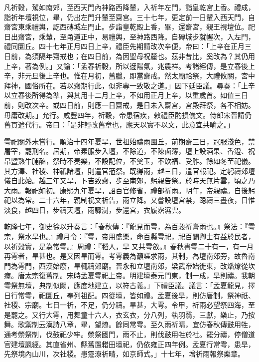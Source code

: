 \begin{pinyinscope}
凡祈穀，駕如南郊，至西天門內神路西降輦，入祈年左門，詣皇乾宮上香。禮成，詣祈年壇視位，畢，仍出左門升輦至齋宮。三十七年，更定前一日輦入西天門，自齋宮東乘禮輿，訖西磚城左門止。步詣皇乾殿上香，畢，還齋宮，親王視壇位。祀日出齋宮，乘輦，至甬道正中，易禮輿，至神路西降。自磚城步就幄次，入左門，禮同圜丘。四十七年正月四日上辛，禮臣先期請改次辛便，帝曰：「上辛在正月三日前，為須隔年齋戒也；在四日前，為因聖母祝釐也。茲非昔比，奚改為？其仍用上辛，著為例。」又諭：「孟春祈穀，所以迓陽氣，兆農祥。考諸經傳，是立春後上辛，非元旦後上辛也。惟在月初，舊臘，即當齋戒。然太廟祫祭，大禮攸關，宮中拜神，國俗所在。若以齋期行此，似非專一致敬之道。」因下廷臣議。尋奏：「上辛以立春後所得為準，與其用十二月上辛，不如用正月上辛，以重歲首。如值三日前，則改次辛。或四日前，則應一日齋戒，是日未入齋宮，宮殿拜祭，各不相妨。毋庸改期。」允行。咸豐四年，祈穀，帝患宿疾，敕禮臣酌損儀文。侍郎宋晉請仍舊貫遣代行。帝曰：「是非輕改舊章也，應天以實不以文，此意宜共喻之。」

雩祀關外未嘗行。順治十四年夏旱，世祖始禱雨圜丘，前期齋三日，冠服淺色，禁屠宰，罷刑名。屆期，帝素服步入壇，不除道，不陳鹵簿，壇上設酒果、香鐙、祝帛暨熟牛脯醢，祭時不奏樂，不設配位，不奠玉，不飲福、受胙。餘如冬至祀儀。其方澤、社稷、神祇諸壇，則遣官蒞祭。既得雨，越三日，遣官報祀。定躬禱郊壇儀自此始。越三年又旱，卜吉致齋，步至南郊，躬親告祭。於時天無片雲，頃之乃大雨。報祀如初。康熙九年夏旱，詔百官修省，禮部祈雨。明年，帝親禱。自後躬祀以為常。二十六年，親制祝文祈告，雨立降。又嘗設壇宮禁，跽禱三晝夜，日惟淡食，越四日，步禱天壇，雨驟澍，步還宮，衣履霑濕雲。

乾隆七年，御史徐以升奏言：「春秋傳：『龍見而雩，為百穀祈膏雨也。』祭法：『雩宗，祭水旱也。』禮月令：『雩，帝用盛樂，命百縣雩祀，祀百闢卿士有益於民者，以祈穀實，是為常雩。』周禮：『稻人，旱又共雩斂。』春秋書雩二十有一，有一月再雩者，旱甚也。是又因旱而雩。考雩義為籲嗟求雨，其制，為壇南郊旁，故魯南門為雩門，西漢始廢，旱輒禱郊廟。晉永和立壇南郊，梁武帝始徙東，改燔燎從坎瘞。唐太宗復舊制。宋時孟夏雩祀上帝。明建壇泰元門東，制一成，旱則禱。我朝雩祭無壇，典制似闕，應度地建立，以符古義。」下禮臣議。議言：「孟夏龍見，擇日行常雩，祀圜丘，奉列祖配。四從壇，皆如禮。孟夏後旱，則仿唐制，祭神祇、社稷、宗廟。七日一祈，不足，仍分禱。旱甚，大雩。令甲，祈雨必望祭四海，至是罷之。又行大雩，用舞童十六人，衣玄衣，分八列，執羽翳，三獻，樂止，乃按舞。歌禦制云漢詩八章，畢，望燎。餘同常雩。至久雨祈晴，宜仿春秋傳鼓用牲，通考禜祭制，伐鼓祀少牢。禜祭國門，雨不止，則伐鼓用牲於社。罷分禱，停僧道官建壇諷經。其直省州、縣舊置耤田壇祀，仍依雍正四年例。孟夏行常雩，患旱，先祭境內山川，次社稷。患霪潦祈晴，如京師式。」十七年，增祈雨報祭樂章。


\end{pinyinscope}
